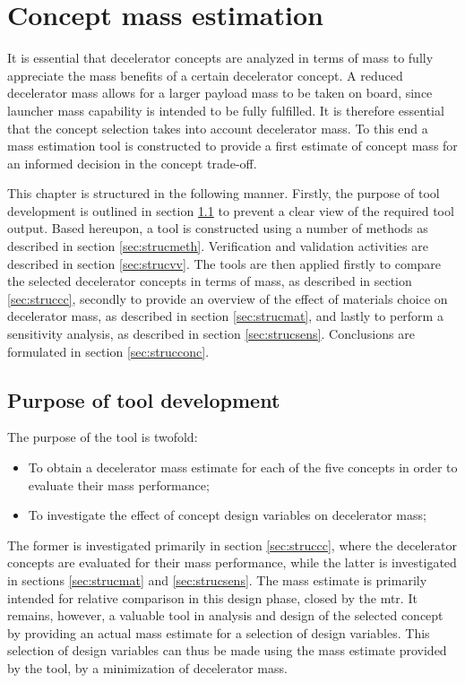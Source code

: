 \section{Concept mass estimation} \label{ch:strucmass}
It is essential that decelerator concepts are analyzed in terms of mass to fully appreciate the mass benefits of a certain decelerator concept. A reduced decelerator mass allows for a larger payload mass to be taken on board, since launcher mass capability is intended to be fully fulfilled. It is therefore essential that the concept selection takes into account decelerator mass. To this end a mass estimation tool is constructed to provide a first estimate of concept mass for an informed decision in the concept trade-off.

This chapter is structured in the following manner. Firstly, the purpose of tool development is outlined in section \ref{sec:strucpurp} to prevent a clear view of the required tool output. Based hereupon, a tool is constructed using a number of methods as described in section \ref{sec:strucmeth}. Verification and validation activities are described in section \ref{sec:strucvv}. The tools are then applied firstly to compare the selected decelerator concepts in terms of mass, as described in section \ref{sec:struccc}, secondly to provide an overview of the effect of materials choice on decelerator mass, as described in section \ref{sec:strucmat}, and lastly to perform a sensitivity analysis, as described in section \ref{sec:strucsens}. Conclusions are formulated in section \ref{sec:strucconc}.

\subsection{Purpose of tool development}\label{sec:strucpurp}
The purpose of the tool is twofold:
\begin{itemize}
\item To obtain a decelerator mass estimate for each of the five concepts in order to evaluate their mass performance;
\item To investigate the effect of concept design variables on decelerator mass;
\end{itemize}
The former is investigated primarily in section \ref{sec:struccc}, where the decelerator concepts are evaluated for their mass performance, while the latter is investigated in sections \ref{sec:strucmat} and \ref{sec:strucsens}. The mass estimate is primarily intended for relative comparison in this design phase, closed by the \acrfull{mtr}. It remains, however, a valuable tool in analysis and design of the selected concept by providing an actual mass estimate for a selection of design variables. This selection of design variables can thus be made using the mass estimate provided by the tool, by a minimization of decelerator mass.

